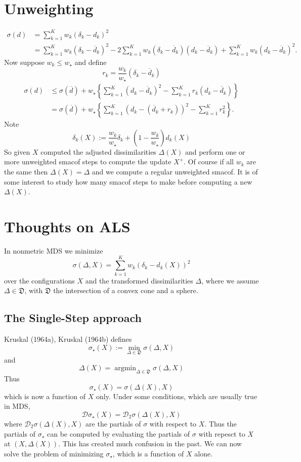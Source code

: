\documentclass[
  12pt,
]{article}
\begin{document}
\section{Unweighting}\label{unweighting}

\begin{align}
\sigma(d)&=\sum_{k=1}^Kw_k(\delta_k-d_k)^2\\
&=\sum_{k=1}^Kw_k(\delta_k-\overline{d}_k)^2-2\sum_{k=1}^Kw_k(\delta_k-\overline{d}_k)(d_k-\overline{d}_k)+\sum_{k=1}^Kw_k(d_k-\overline{d}_k)^2.
\end{align}
Now suppose \(w_k\leq w_\star\) and define
\[
r_k=\frac{w_k}{w_\star}(\delta_k-\overline{d}_k)
\]
\begin{align*}
\sigma(d)&\leq\sigma(\overline{d})+w_\star\left\{\sum_{k=1}^K(d_k-\overline{d}_k)^2-\sum_{k=1}^Kr_k(d_k-\overline{d}_k)\right\}\\&=\sigma(\overline{d})+w_\star\left\{\sum_{k=1}^K(d_k-(\overline{d}_k+r_k))^2-\sum_{k=1}^Kr_k^2\right\}.
\end{align*}
Note
\[
\delta_k(X):=\frac{w_k}{w_\star}\delta_k+(1-\frac{w_k}{w_\star})d_k(X)
\]
So given \(X\) computed the adjusted dissimilarities \(\Delta(X)\) and perform one or more unweighted smacof
steps to compute the update \(X^+\). Of course if all \(w_k\) are the same then \(\Delta(X)=\Delta\) and we
compute a regular unweighted smacof. It is of some interest to study how many smacof steps to make
before computing a new \(\Delta(X)\).

\section{Thoughts on ALS}\label{thoughts-on-als}

In nonmetric MDS we minimize
\[
\sigma(\Delta,X)=\sum_{k=1}^K w_k(\delta_k-d_k(X))^2
\]
over the configurations \(X\) and the transformed dissimilarities \(\Delta\),
where we assume \(\Delta\in\mathfrak{D}\), with \(\mathfrak{D}\) the intersection of
a convex cone and a sphere.

\subsection{The Single-Step approach}\label{the-single-step-approach}

Kruskal (1964a), Kruskal (1964b) defines
\[
\sigma_\star(X):=\min_{\Delta\in\mathfrak{D}}\sigma(\Delta,X)
\]
and
\[
\Delta(X)=\mathop{\text{argmin}}_{\Delta\in\mathfrak{D}}\sigma(\Delta,X)
\]
Thus
\[
\sigma_\star(X)=\sigma(\Delta(X),X)
\]
which is now a function of \(X\) only. Under some conditions, which are usually true in MDS,
\[
\mathcal{D}\sigma_\star(X)=\mathcal{D}_2\sigma(\Delta(X),X)
\]
where \(\mathcal{D}_2\sigma(\Delta(X),X)\) are the partials of \(\sigma\) with respect to \(X\).
Thus the partials of \(\sigma_\star\) can be computed by evaluating the partials of \(\sigma\)
with repesct to \(X\) at \((X,\Delta(X))\). This has created much confusion in the past. We can now solve the problem of minimizing \(\sigma_\star\), which is a function of \(X\) alone.
\end{document}
